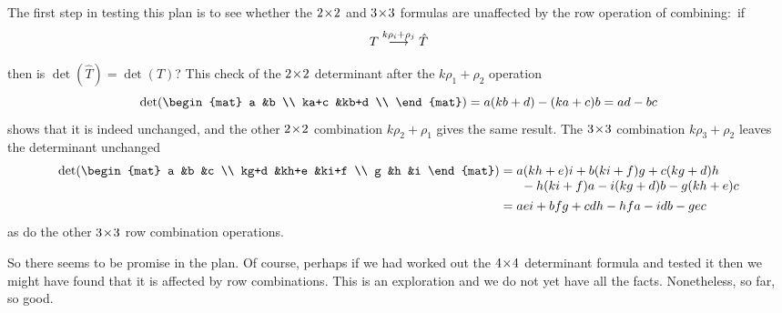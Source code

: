 The first step in testing this plan is to see whether   
the $2 \! \times \! 2$ and $3 \! \times \! 3$ formulas are unaffected by the 
row operation of combining:~if 
\begin{equation*}
   T \mathrel{ \mathop{\longrightarrow}\limits^{k\rho_i+\rho_j\mathstrut}_{ \begin{subarray}{l} \relax \end{subarray}}} \hat{T}
\end{equation*}
then is \( \det(\hat{T})=\det(T) \)? 
This check of the $2 \! \times \! 2$ determinant after the $k\rho_1+\rho_2$ operation
\begin{equation*}
   \det(
       \begin{mat}
         a     &b       \\
         ka+c  &kb+d    \\
      \end{mat}
   )
   = a(kb+d)-(ka+c)b = ad-bc
\end{equation*}
shows that it is indeed unchanged, and
the other $2 \! \times \! 2$ combination $k\rho_2+\rho_1$ gives the same result.
The $3 \! \times \! 3$ combination $k\rho_3+\rho_2$ leaves the determinant unchanged
  \begin{align*}
    \det(
      \begin{mat}
         a    &b    &c    \\
         kg+d &kh+e &ki+f \\
         g    &h    &i
      \end{mat}
    )
    &=\begin{array}[t]{@{}l@{}}
         a(kh+e)i+b(ki+f)g+c(kg+d)h \\
         \ \hbox{}-h(ki+f)a-i(kg+d)b-g(kh+e)c  
    \end{array}                                 \\
     &=aei + bfg + cdh - hfa - idb - gec
  \end{align*}
as do the other $3 \! \times \! 3$ row combination operations.

So there seems to be promise in the plan.
Of course, perhaps if we had worked out 
the $4 \! \times \! 4$ determinant formula and tested it then we might have found
that it is affected by row combinations.
This is an exploration and we do not yet have all the facts.
Nonetheless, so far, so good.


